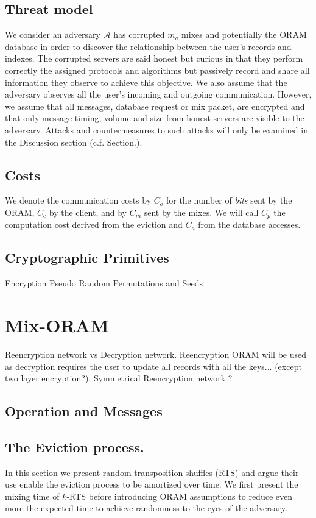 \documentclass[conference]{IEEEtran}
\begin{document}
\subsection{Threat model}
We consider an adversary $\mathcal{A}$ has corrupted $m_{a}$ mixes and potentially the ORAM database in order to discover the relationship between the user's records and indexes. 
The corrupted servers are said honest but curious in that they perform correctly the assigned protocols and algorithms but passively record and share all information they observe to achieve this objective.
We also assume that the adversary observes all the user's incoming and outgoing communication. However, we assume that all messages, database request or mix packet, are encrypted and that only message timing, volume and size from honest servers are visible to the adversary.
Attacks and countermeasures to such attacks will only be examined in the Discussion section (c.f. Section.\cite{}).

\subsection{Costs}
We denote the communication costs by $C_o$ for the number of \emph{bits} sent by the ORAM, $C_{c}$ by the client, and by $C_{m}$ sent by the mixes. 
We will call $C_p$ the computation cost derived from the eviction and $C_a$ from the database accesses.

\subsection{Cryptographic Primitives}
Encryption
Pseudo Random Permutations and Seeds

\section{Mix-ORAM}
\label{section2}
Reencryption network vs Decryption network. Reencryption ORAM will be used as decryption requires the user to update all records with all the keys... (except two layer encryption?).
Symmetrical Reencryption network ?

\subsection{Operation and Messages}
\subsection{The Eviction process.}
In this section we present random transposition shuffles (RTS) and argue their use enable the eviction process to be amortized over time.
We first present the mixing time of $k$-RTS before introducing ORAM assumptions to reduce even more the expected time to achieve randomness to the eyes of the adversary.
\end{document}
